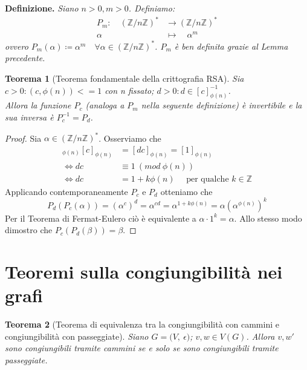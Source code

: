 \documentclass[12pt,twoside]{article}
\newcommand{\Z}{\mathbb{Z}}
\newcommand{\sesolose}{\Leftrightarrow}
\newcommand{\pq}{\text{ per qualche }}
\newcommand{\znz}{\displaystyle({\Z}/{n\Z})^*}
\newcommand{\Eps}{${\Large$\epsilon$}$}
\newcommand{\grafo}{(V, \: \Eps)}
\newtheorem{theorem}{Teorema}
\begin{document}
\noindent
\textbf{Definizione.}
\textit{Siano $n>0, m>0$. Definiamo:
\begin{align*}
P_{m}:\quad \znz &\longrightarrow \znz \\
\alpha \quad&\longmapsto \quad\alpha^{m}
\end{align*}
ovvero $P_m(\alpha) \coloneqq \alpha^m \quad\forall \alpha \in \znz$. $P_m$ è ben definita grazie al Lemma precedente.}

\begin{theorem}[Teorema fondamentale della crittografia RSA]
Sia $c > 0: (c, \phi(n)) <= 1$ con n fissato; $d > 0: d \in [c]_{\phi(n)}^{-1}$. \\
Allora la funzione $P_c$ (analoga a $P_m$ nella seguente definizione) è invertibile e la sua inversa è $P_{c}^{-1} = P_d$.\\
\end{theorem}


\begin{proof}
Sia $\alpha \in \znz$. Osserviamo che 
\begin{align*}
[d]_{\phi(n)}[c]_{\phi(n)} &= [dc]_{\phi(n)} = [1]_{\phi(n)} \\
\sesolose dc &\equiv 1 \ (mod \ \phi(n)) \\
\sesolose dc &= 1 + k\phi(n)\quad \pq k \in \Z
\end{align*}
Applicando contemporaneamente $P_c$ e $P_d$ otteniamo che 
$$ P_d(P_c(\alpha)) = (\alpha^c)^d = \alpha^{cd} = \alpha^{1+k\phi(n)} = \alpha(\alpha^{\phi(n)})^{k} $$
Per il Teorema di Fermat-Eulero ciò è equivalente a $\alpha \cdot 1^k = \alpha$. Allo stesso modo dimostro che $P_c(P_d(\beta)) = \beta$.
\end{proof}

\section{Teoremi sulla congiungibilità nei grafi}
\begin{theorem}[Teorema di equivalenza tra la congiungibilità con cammini e congiungibilità con passeggiate]
Siano $G = \grafo$; $v, w \in V(G)$. Allora $v, w'$ sono congiungibili tramite cammini se e solo se sono congiungibili tramite passeggiate.
\end{theorem}
\end{document}
